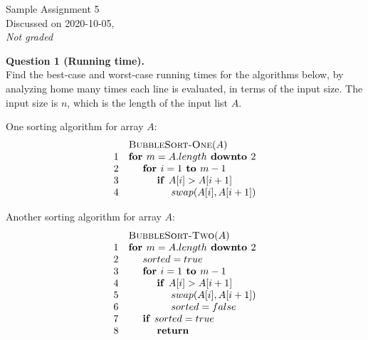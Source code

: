 \documentclass[a4paper,12pt]{article}
\begin{document}
\twocolumn

\thispagestyle{empty}

\begin{center}
{\Large Sample Assignment 5}\\
{\Large Discussed on 2020-10-05,}\\
{\em Not graded} 
\end{center}

\noindent


\vspace{10pt}
{\bf Question 1 (Running time).}\\
Find the best-case and worst-case running times for the algorithms below, by analyzing home many times each line is evaluated, in terms of the input size. 
The input size is $n$, which is the length of the input list $A$.

\vspace{10pt}
One sorting algorithm for array $A$:
\[
\begin{array}{rl}
 & \text{\sc BubbleSort-One}(A)\\
1 & \text{\textbf{for\ }}m = A.length \text{\textbf{\ downto\ }}2 \\
2 & \hspace{.5cm} \text{\textbf{for\ }} i = 1 \text{\textbf{\ to\ }} m-1 \\
3 & \hspace{1cm} \text{\textbf{if\ }} A[i] > A[i+1] \\
4 & \hspace{1.5cm} swap(A[i],A[i+1]) 
\end{array}
\]



\vspace{10pt}
Another sorting algorithm for array $A$:
\[
\begin{array}{r l}
 & \text{\sc BubbleSort-Two}(A)\\
1 & \text{\textbf{for\ }}m = A.length \text{\textbf{\ downto\ }}2 \\
2 & \hspace{.5cm} sorted = true \\
3 & \hspace{.5cm} \text{\textbf{for\ }} i = 1 \text{\textbf{\ to\ }} m-1 \\
4 & \hspace{1cm} \text{\textbf{if\ }} A[i] > A[i+1] \\
5 & \hspace{1.5cm} swap(A[i],A[i+1]) \\
6 & \hspace{1.5cm} sorted = false \\
7 & \hspace{.5cm} \text{\textbf{if\ }}sorted = true \\
8 & \hspace{1cm} \text{\textbf{return}} 
\end{array}
\]
\end{document}
